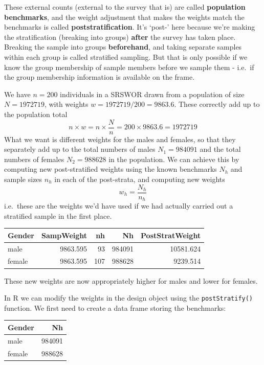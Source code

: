 \documentclass[
]{book}
\begin{document}
These external counts (external to the survey that is) are called \textbf{population benchmarks},
and the weight adjustment that makes the weights match the benchmarks is called
\textbf{poststratification}. It's `post-' here because we're making the stratification
(breaking into groups) \textbf{after} the survey has taken place. Breaking the sample into
groups \textbf{beforehand}, and taking separate samples within each group is called stratified
sampling. But that is only possible if we know the group membership of sample members before
we sample them - i.e.~if the group membership information is available on the frame.

We have \(n=200\) individuals in a SRSWOR drawn from a population
of size \(N=1972719\), with weights
\(w=1972719/200=9863.6\). These
correctly add up to the population total
\[
   n \times w = n \times \frac{N}{n} = 200\times 9863.6 = 1972719
\]
What we want is different weights for the males and females, so that they separately
add up to the total numbers of males \(N_1=984091\) and the total
numbers of females \(N_2=988628\) in the population. We can achieve this
by computing new post-stratified weights using the known benchmarks \(N_h\) and sample
sizes \(n_h\) in each of the post-strata, and computing new weights
\[
   w_h = \frac{N_h}{n_h}
\]
i.e.~these are the weights we'd have used if we had actually carried out a
stratified sample in the first place.

\begin{table}
\centering
\begin{tabular}[t]{l|r|r|r|r}
\hline
Gender & SampWeight & nh & Nh & PostStratWeight\\
\hline
male & 9863.595 & 93 & 984091 & 10581.624\\
\hline
female & 9863.595 & 107 & 988628 & 9239.514\\
\hline
\end{tabular}
\end{table}

These new weights are now appropriately higher for males and lower for females.

In R we can modify the weights in the design object using the \texttt{postStratify()} function.
We first need to create a data frame storing the benchmarks:

\begin{table}
\centering
\begin{tabular}[t]{l|r}
\hline
Gender & Nh\\
\hline
male & 984091\\
\hline
female & 988628\\
\hline
\end{tabular}
\end{table}
\end{document}

